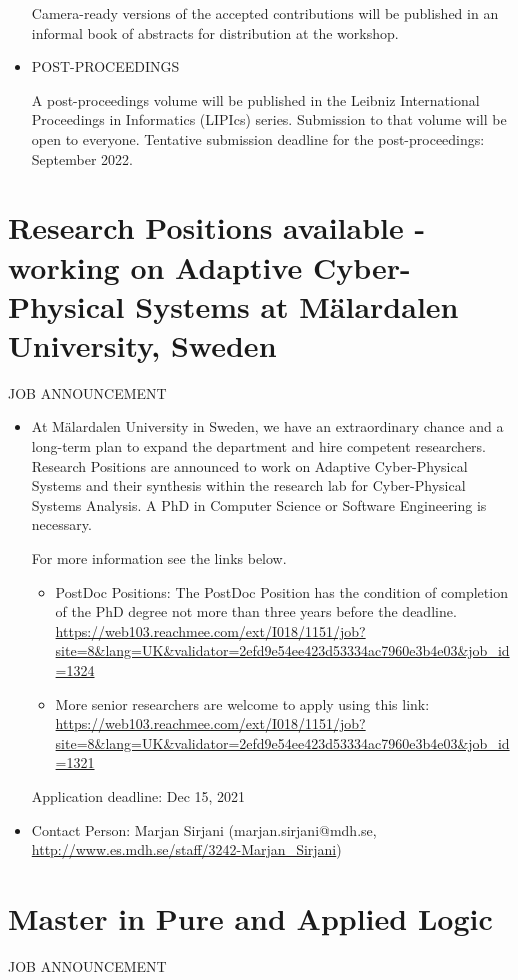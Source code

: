 \documentclass[prodmode,acmtecs]{acmsmall} %
\begin{document}
\begin{itemize}
  Camera-ready versions of the accepted contributions will be published in an informal book of abstracts for distribution at the workshop. 
 
\item  POST-PROCEEDINGS 
 
  A post-proceedings volume will be published in the Leibniz International Proceedings in Informatics (LIPIcs) series. Submission to that volume will be open to everyone. Tentative submission deadline for the post-proceedings: September 2022. 
 
\end{itemize}\section{Research Positions available - working on Adaptive Cyber-Physical Systems at Mälardalen University, Sweden}\label{ResearchPositionsavailableworkingonAdaptiveCyberPhysicalSystemsatMlardalenUniversitySweden}JOB ANNOUNCEMENT 

\begin{itemize}\item   At Mälardalen University in Sweden,  we have an extraordinary chance and a long-term plan to expand the department and hire competent researchers. Research Positions are announced to work on Adaptive Cyber-Physical Systems and their synthesis within the research lab for Cyber-Physical Systems Analysis. A PhD in Computer Science or Software Engineering is necessary. 
 
  For more information see the links below. 
 
\begin{itemize}\item  PostDoc Positions: The PostDoc Position has the condition of completion of the PhD degree not more than three years before the deadline. \href{https://web103.reachmee.com/ext/I018/1151/job?site=8\&lang=UK\&validator=2efd9e54ee423d53334ac7960e3b4e03\&job_id=1324}{https://web103.reachmee.com/ext/I018/1151/job?site=8\&lang=UK\&validator=2efd9e54ee423d53334ac7960e3b4e03\&job\_id=1324}
\item  More senior researchers are welcome to apply using this link: \href{https://web103.reachmee.com/ext/I018/1151/job?site=8\&lang=UK\&validator=2efd9e54ee423d53334ac7960e3b4e03\&job_id=1321}{https://web103.reachmee.com/ext/I018/1151/job?site=8\&lang=UK\&validator=2efd9e54ee423d53334ac7960e3b4e03\&job\_id=1321}
\end{itemize} 
Application deadline: Dec 15, 2021 
 
\item  Contact Person: Marjan Sirjani (marjan.sirjani@mdh.se, \href{http://www.es.mdh.se/staff/3242-Marjan_Sirjani}{http://www.es.mdh.se/staff/3242-Marjan\_Sirjani}) 
 
\end{itemize}\section{Master in Pure and Applied Logic }\label{MasterinPureandAppliedLogic}JOB ANNOUNCEMENT 
\end{document}
